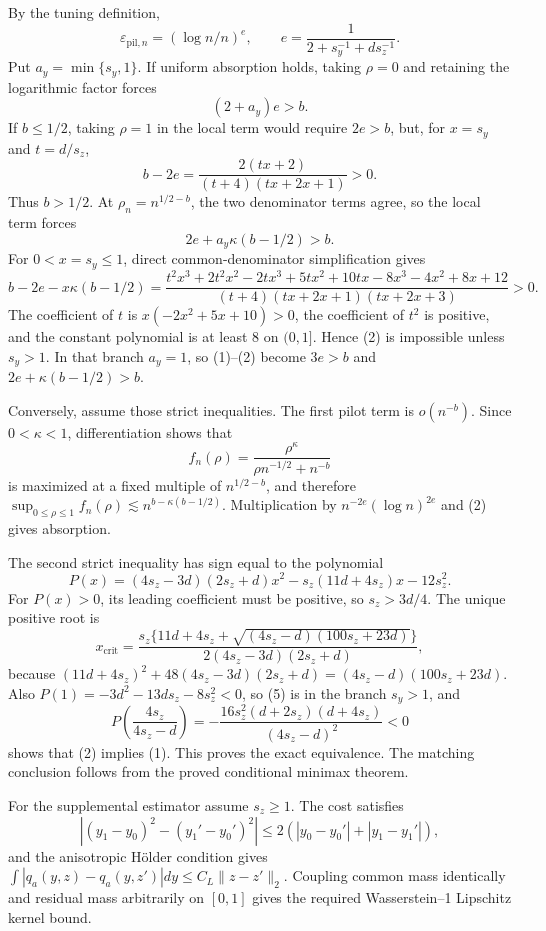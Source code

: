 By the tuning definition,
\[
\varepsilon_{\mathrm{pil},n}=(\log n/n)^e,
\qquad e=\frac1{2+s_y^{-1}+ds_z^{-1}}.
\]
Put \(a_y=\min\{s_y,1\}\). If uniform absorption holds, taking \(\rho=0\) and retaining the logarithmic factor forces
\[
(2+a_y)e>b.                                                            \tag{1}
\]
If \(b\le1/2\), taking \(\rho=1\) in the local term would require \(2e>b\), but, for \(x=s_y\) and \(t=d/s_z\),
\[
b-2e=\frac{2(tx+2)}{(t+4)(tx+2x+1)}>0.
\]
Thus \(b>1/2\). At \(\rho_n=n^{1/2-b}\), the two denominator terms agree, so the local term forces
\[
2e+a_y\kappa(b-1/2)>b.                                                 \tag{2}
\]
For \(0<x=s_y\le1\), direct common-denominator simplification gives
\[
b-2e-x\kappa(b-1/2)
=\frac{t^2x^3+2t^2x^2-2tx^3+5tx^2+10tx-8x^3-4x^2+8x+12}
{(t+4)(tx+2x+1)(tx+2x+3)}>0.                                          \tag{3}
\]
The coefficient of \(t\) is \(x(-2x^2+5x+10)>0\), the coefficient of \(t^2\) is positive, and the constant polynomial is at least \(8\) on \((0,1]\). Hence (2) is impossible unless \(s_y>1\). In that branch \(a_y=1\), so (1)--(2) become \(3e>b\) and \(2e+\kappa(b-1/2)>b\).

Conversely, assume those strict inequalities. The first pilot term is \(o(n^{-b})\). Since \(0<\kappa<1\), differentiation shows that
\[
f_n(\rho)=\frac{\rho^\kappa}{\rho n^{-1/2}+n^{-b}}
\]
is maximized at a fixed multiple of \(n^{1/2-b}\), and therefore \(\sup_{0\le\rho\le1}f_n(\rho)\lesssim n^{b-\kappa(b-1/2)}\). Multiplication by \(n^{-2e}(\log n)^{2e}\) and (2) gives absorption.

The second strict inequality has sign equal to the polynomial
\[
P(x)=(4s_z-3d)(2s_z+d)x^2-s_z(11d+4s_z)x-12s_z^2.                    \tag{4}
\]
For \(P(x)>0\), its leading coefficient must be positive, so \(s_z>3d/4\). The unique positive root is
\[
x_{\mathrm{crit}}=
\frac{s_z\{11d+4s_z+\sqrt{(4s_z-d)(100s_z+23d)}\}}
{2(4s_z-3d)(2s_z+d)},                                                  \tag{5}
\]
because \((11d+4s_z)^2+48(4s_z-3d)(2s_z+d)=(4s_z-d)(100s_z+23d)\). Also \(P(1)=-3d^2-13ds_z-8s_z^2<0\), so (5) is in the branch \(s_y>1\), and
\[
P\!\left(\frac{4s_z}{4s_z-d}\right)
=-\frac{16s_z^2(d+2s_z)(d+4s_z)}{(4s_z-d)^2}<0
\]
shows that (2) implies (1). This proves the exact equivalence. The matching conclusion follows from the proved conditional minimax theorem.

For the supplemental estimator assume \(s_z\ge1\). The cost satisfies
\[
|(y_1-y_0)^2-(y_1'-y_0')^2|\le2(|y_0-y_0'|+|y_1-y_1'|),              \tag{6}
\]
and the anisotropic H\"older condition gives \(\int|q_a(y,z)-q_a(y,z')|dy\le C_L\|z-z'\|_2\). Coupling common mass identically and residual mass arbitrarily on \([0,1]\) gives the required Wasserstein--1 Lipschitz kernel bound.

